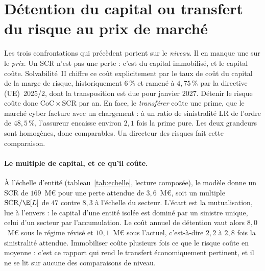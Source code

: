 
\section{Détention du capital ou transfert du risque au prix de marché}

Les trois confrontations qui précèdent portent sur le \emph{niveau}. Il en manque une sur le
\emph{prix}. Un SCR n'est pas une perte : c'est du capital immobilisé, et le capital coûte.
Solvabilité~II chiffre ce coût explicitement par le taux de coût du capital de la marge de
risque, historiquement $6\,\%$ et ramené à $4{,}75\,\%$ par la directive
(UE)~2025/2, dont la transposition est due pour janvier 2027. Détenir le risque coûte donc
$\mathrm{CoC}\times\mathrm{SCR}$ par an. En face, le \emph{transférer} coûte une prime, que le
marché cyber facture avec un chargement : à un ratio de sinistralité $\mathrm{LR}$ de l'ordre de
$48{,}5\,\%$, l'assureur encaisse environ $2{,}1$ fois la prime pure. Les deux grandeurs sont
homogènes, donc comparables. Un directeur des risques fait cette comparaison.

\paragraph{Le multiple de capital, et ce qu'il coûte.} À l'échelle d'entité
(tableau~\ref{tab:echelle}, lecture composée), le modèle donne un SCR de $169$~M\euro{} pour une
perte attendue de $3{,}6$~M\euro, soit un multiple $\mathrm{SCR}/\E[L]$ de $47$ contre $8{,}3$
à l'échelle du secteur. L'écart est la mutualisation, lue à l'envers : le capital d'une entité
isolée est dominé par un sinistre unique, celui d'un secteur par l'accumulation. Le coût annuel
de détention vaut alors $8{,}0$~M\euro{} sous le régime révisé et $10{,}1$~M\euro{} sous
l'actuel, c'est-à-dire $2{,}2$ à $2{,}8$ fois la sinistralité attendue. Immobiliser
coûte plusieurs fois ce que le risque coûte en moyenne : c'est ce rapport qui rend le transfert
économiquement pertinent, et il ne se lit sur aucune des comparaisons de niveau.


